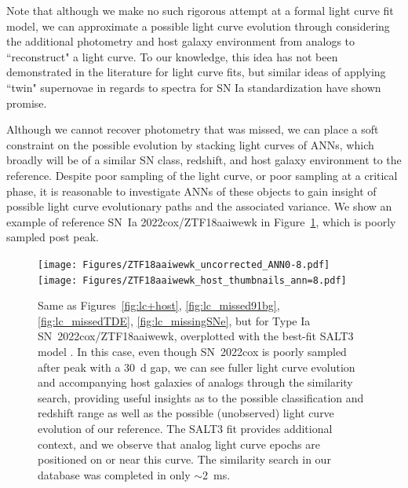 \documentclass[twocolumn]{aastex63}
\begin{document}
Note that although we make no such rigorous attempt at a formal light curve fit model, we can approximate a possible light curve evolution through considering the additional photometry and host galaxy environment from analogs to ``reconstruct" a light curve. To our knowledge, this idea has not been demonstrated in the literature for light curve fits, but similar ideas of applying ``twin" supernovae in regards to spectra for SN Ia standardization \citep{Fakhouri2015, Boone2021TEII} have shown promise. \par

Although we cannot recover photometry that was missed, we can place a soft constraint on the possible evolution by stacking light curves of ANNs, which broadly will be of a similar SN class, redshift, and host galaxy environment to the reference. Despite poor sampling of the light curve, or poor sampling at a critical phase, it is reasonable to investigate ANNs of these objects to gain insight of possible light curve evolutionary paths and the associated variance. We show an example of reference SN~Ia 2022cox/ZTF18aaiwewk in Figure~\ref{fig:lc_extrapolation}, which is poorly sampled post peak. \par %

\begin{figure}
    \centering
    \texttt{[image: Figures/ZTF18aaiwewk\_uncorrected\_ANN0-8.pdf]}
    \texttt{[image: Figures/ZTF18aaiwewk\_host\_thumbnails\_ann=8.pdf]}
    \caption{
    Same as Figures~\ref{fig:lc+host}, \ref{fig:lc_missed91bg},  \ref{fig:lc_missedTDE}, \ref{fig:lc_missingSNe}, but for Type Ia SN~2022cox/ZTF18aaiwewk, overplotted with the best-fit SALT3 model \citep{Kenworthy2021}. In this case, even though SN~2022cox is poorly sampled after peak with a 30~d gap, we can see fuller light curve evolution and accompanying host galaxies of analogs through the similarity search, providing useful insights as to the possible classification and redshift range  as well as the possible (unobserved) light curve evolution of our reference. The SALT3 fit provides additional context, and we observe that analog light curve epochs are positioned on or near this curve. The similarity search in our database was completed in only $\sim$2~ms. 
    } 
    \label{fig:lc_extrapolation}
\end{figure}
\end{document}

